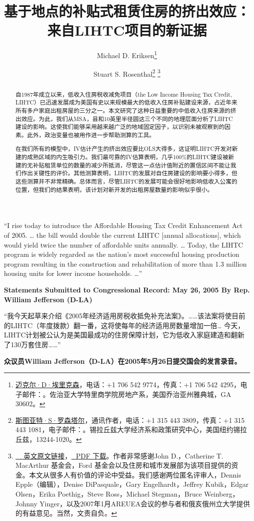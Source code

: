 \documentclass[lang=cn,11pt,a4paper]{paper}
\title{基于地点的补贴式租赁住房的挤出效应：来自LIHTC项目的新证据}
\author{Michael D. Eriksen\thanks{\href{http://www.eriksen.myweb.uga.edu}{迈克尔·D·埃里克森}，电话：+1 706 542 9774，传真：+1 706 542 4295，电子邮件：\email{eriksen@terry.uga.edu}。佐治亚大学特里商学院房地产系，美国乔治亚州雅典城，GA 30602。} \and Stuart S. Rosenthal\thanks{\href{http://www.faculty.maxwell.syr.edu/rosenthal}{斯图亚特·S·罗森塔尔}，通讯作者，电话：+1 315 443 3809，传真：+1 315 443 1081，电子邮件：\email{ssrosent@maxwell.syr.edu}。锡拉丘兹大学经济系和政策研究中心，美国纽约锡拉丘兹，13244-1020。}\; \thanks{\href{https://www.sciencedirect.com/science/article/pii/S0047272710000885}{~\faLink\,~英文原文链接}，\href{https://sci-hub.tw/10.1016/j.jpubeco.2010.07.002}{\faFilePdfO\,~PDF 下载}。作者非常感谢John D.，Catherine T. MacArthur 基金会，Ford 基金会以及住房和城市发展部为该项目提供的资金。本文从很多人有价值的评论中受益。我们感谢两位匿名评审人，Dennis Epple（编辑），Denise DiPasquale，Gary Engelhardt，Jeffrey Kubik，Edgar Olsen，Erika Poethig，Steve Ross，Michael Stegman，Bruce Weinberg，Johnny Yinger，以及2007年1月AREUEA会议的参与者和俄亥俄州立大学提供的有益意见。当然，文责自负。}}
\date{\zhtoday}
\begin{document}
\maketitle

\begin{abstract}
  \hspace{2\ccwd}自1987年成立以来，低收入住房税收减免项目（the Low Income Housing Tax Credit, LIHTC）已迅速发展成为美国有史以来规模最大的低收入住房补贴建设来源，占近年来所有多户家庭出租房屋的三分之一。本文研究了这种日益重要的中低收入住房来源的挤出效应。为此，我们从MSA，县和10英里半径圆这三个不同的地理层面分析了LIHTC建设的影响。这使我们能够采用越来越广泛的地域固定因子，以识别未被观察到的因素。此外，政治变量也被用作进一步帮助测算的工具。
  
  \!在我们所有的模型中，IV估计产生的挤出效应要比OLS大得多，这证明LIHTC开发对新建的成熟区域的内生吸引力。我们最可靠的IV估算表明，几乎100\%的LIHTC建设被新建的无补贴租赁单位的数量的减少所抵消，尽管这一点估计值附近的置信区间不能让我们作出关键性的评价。其他测算表明，LIHTC的发展对自住房建设的影响要小得多，但这些测算并不非常精确。总体而言，尽管LIHTC的发展可能会很好地影响低收入公寓的位置，但我们的结果表明，该计划对新开发的出租房屋数量的影响似乎很小。

\end{abstract}
\vspace{10pt}

\begin{tcolorbox}[
	colback=yellow!10!white,
  colframe=red!30!black,
  fontupper = \itshape,
]
“I rise today to introduce the Affordable Housing Tax Credit Enhancement Act of 2005. … the bill would double the current LIHTC [annual allocations], which would yield twice the number of affordable units annually. … Today, the LIHTC program is widely regarded as the nation's most successful housing production program resulting in the construction and rehabilitation of more than 1.3 million housing units for lower income households. …”
\vspace{5pt}

\textbf{Statements Submitted to Congressional Record: May 26, 2005 By Rep. William Jefferson (D-LA)}

\tcblower

“我今天起草来介绍《2005年经济适用房税收抵免补充法案》。……该法案将使目前的LIHTC（年度拨款）翻一番，这将使每年的经济适用房数量增加一倍… 今天，LIHTC计划被公认为是美国最成功的住房保障计划，它为低收入家庭建造和翻新了130万套住房……”
\vspace{5pt}

\textbf{众议员William Jefferson（D-LA）在2005年5月26日提交国会的发言录音。}

\end{tcolorbox}
\vspace{10pt}
\end{document}
